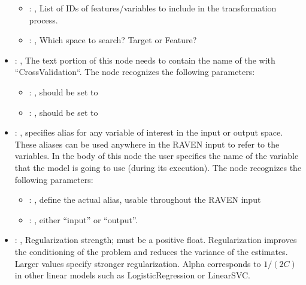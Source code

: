 \begin{itemize}
\begin{itemize}
        \item {}: , 
          List of IDs of features/variables to include in the transformation process.

        \item {}: , 
          Which space to search? Target or Feature?
      \end{itemize}

    \item {}: , 
      The text portion of this node needs to contain the name of the  with
               ``CrossValidation``.
      The  node recognizes the following parameters:
        \begin{itemize}
          \item {}: , 
            should be set to 
          \item {}: , 
            should be set to 
      \end{itemize}

    \item {}: , 
      specifies alias for         any variable of interest in the input or output space. These
      aliases can be used anywhere in the RAVEN input to         refer to the variables. In the body
      of this node the user specifies the name of the variable that the model is going to use
      (during its execution).
      The  node recognizes the following parameters:
        \begin{itemize}
          \item {}: , 
            define the actual alias, usable throughout the RAVEN input
          \item {}: , 
            either ``input'' or ``output''.
      \end{itemize}

    \item {}: , 
      Regularization strength; must be a positive float. Regularization
      improves the conditioning of the problem and reduces the variance of the estimates.
      Larger values specify stronger regularization. Alpha corresponds to $1 / (2C)$ in other
      linear models such as LogisticRegression or LinearSVC.


\end{itemize}

